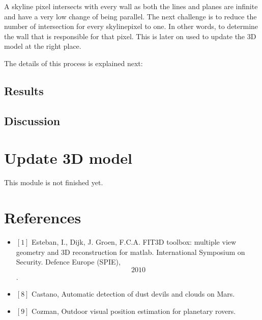 \documentclass[10pt]{article}
\begin{document}
A skyline pixel intersects with every wall as both the lines and planes are
infinite and have a very low change of being parallel.
The next challenge is to reduce the number of intersection for every skylinepixel
to one. In other words, to determine the wall that is responsible for that pixel. 
This is later on used to update the 3D model at the right place.

The details of this process is explained next:

\subsection{Results}


\subsection{Discussion}

\section{Update 3D model}
This module is not finished yet.


\section{References}
\begin{itemize}
\item $[1]$ 
Esteban, I., Dijk, J. Groen, F.C.A. FIT3D toolbox: multiple view geometry and
3D reconstruction for matlab. International Symposium on Security. Defence
Europe (SPIE), \[2010\].
\item $[8]$ Castano, Automatic detection of dust devils and clouds on Mars.
\item $[9]$ Cozman, Outdoor visual position estimation for planetary rovers.
\end{itemize}



%
\end{document}
